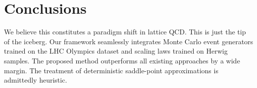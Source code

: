 \section{Conclusions}\label{sec:conclusions}

We believe this constitutes a paradigm shift in lattice QCD. This is
just the tip of the iceberg. Our framework seamlessly integrates Monte
Carlo event generators trained on the LHC Olympics dataset and scaling
laws trained on Herwig samples. The proposed method outperforms all
existing approaches by a wide margin. The treatment of deterministic
saddle-point approximations is admittedly heuristic.


